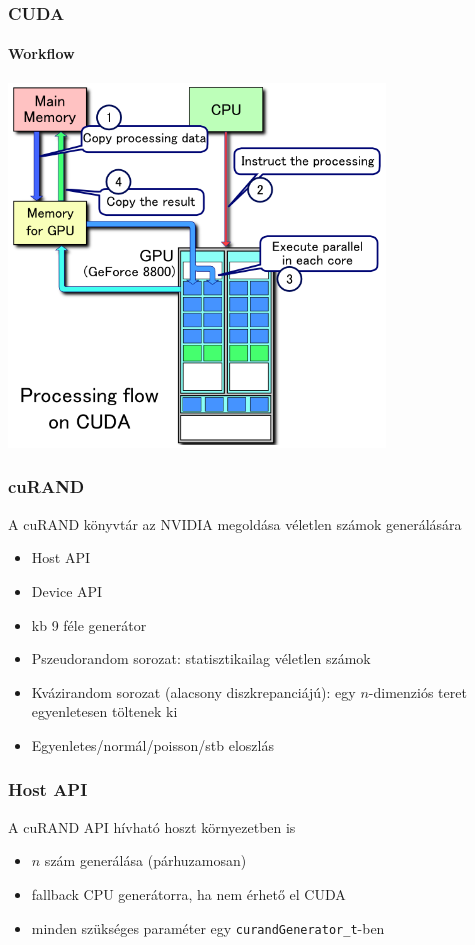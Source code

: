 \documentclass[xetex]{beamer}
\begin{document}
  \begin{frame}
    \frametitle{CUDA}
    \framesubtitle{Workflow}
    \includegraphics[width=10cm]{figures/cuda_workflow.png}
  \end{frame}
  \begin{frame}
    \frametitle{cuRAND}
    A cuRAND könyvtár az NVIDIA megoldása véletlen számok generálására
    \begin{itemize}
      \item Host API
      \item Device API
      \item kb 9 féle generátor
      \item Pszeudorandom sorozat: statisztikailag véletlen számok
      \item Kvázirandom sorozat (alacsony diszkrepanciájú): egy $n$-dimenziós teret egyenletesen töltenek ki
      \item Egyenletes/normál/poisson/stb eloszlás
    \end{itemize}
  \end{frame}
  \begin{frame}
    \frametitle{Host API}
    A cuRAND API hívható hoszt környezetben is
    \begin{itemize}
      \item $n$ szám generálása (párhuzamosan)
      \item fallback CPU generátorra, ha nem érhető el CUDA
      \item minden szükséges paraméter egy \texttt{curandGenerator\_t}-ben
    \end{itemize}
  \end{frame}
\end{document}
